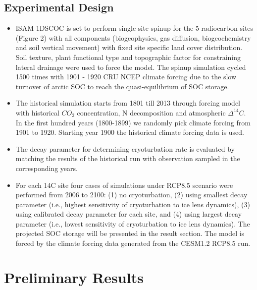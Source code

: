 \documentclass[portait,custom]{sciposter}
\begin{document}
\begin{multicols*}{4}

\subsection*{Experimental Design}
 \begin{itemize}
  \item ISAM-1DSCOC is set to perform single site spinup for the 5 radiocarbon sites (Figure 2) with all components (biogeophysics, gas diffusion, biogeochemistry and soil vertical movement) with fixed site specific land cover distribution. Soil texture, plant functional type and topographic factor for constraining lateral drainage were used to force the model. The spinup simulation cycled 1500 times with 1901 - 1920 CRU NCEP climate forcing due to the slow turnover of arctic SOC to reach the quasi-equilibrium of SOC storage.
  \item The historical simulation starts from 1801 till 2013 through forcing model with historical $CO_2$ concentration, N decomposition and atmospheric $\Delta ^{14}C$. In the first hundred years (1800-1899) we randomly pick climate forcing from 1901 to 1920. Starting year 1900 the historical climate forcing data is used.
  \item The decay parameter for determining cryoturbation rate is evaluated by matching the results of the historical run with observation sampled in the corresponding years.
  \item For each 14C site four cases of simulations under RCP8.5 scenario were performed from 2006 to 2100: (1) no cryoturbation, (2) using smallest decay parameter (i.e., highest sensitivity of cryoturbation to ice lens dynamics), (3) using calibrated decay parameter for each site, and (4) using largest decay parameter (i.e., lowest sensitivity of cryoturbation to ice lens dynamics). The projected SOC storage will be presented in the result section. The model is forced by the climate forcing data generated from the CESM1.2 RCP8.5 run.
% 
 \end{itemize}

\section*{Preliminary Results}


\end{multicols*}
\end{document}
